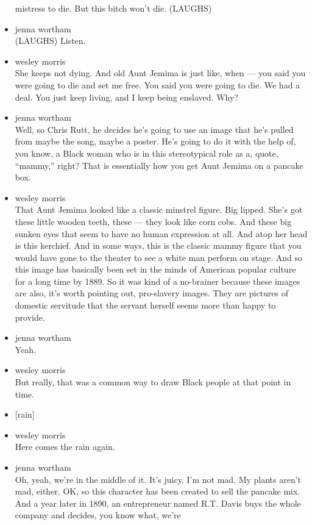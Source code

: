 \begin{itemize}
  mistress to die. But this bitch won't die. (LAUGHS)
\item
  jenna wortham\\
  (LAUGHS) Listen.
\item
  wesley morris\\
  She keeps not dying. And old Aunt Jemima is just like, when --- you
  said you were going to die and set me free. You said you were going to
  die. We had a deal. You just keep living, and I keep being enslaved.
  Why?
\item
  jenna wortham\\
  Well, so Chris Rutt, he decides he's going to use an image that he's
  pulled from maybe the song, maybe a poster. He's going to do it with
  the help of, you know, a Black woman who is in this stereotypical role
  as a, quote, ``mammy,'' right? That is essentially how you get Aunt
  Jemima on a pancake box.
\item
  wesley morris\\
  That Aunt Jemima looked like a classic minstrel figure. Big lipped.
  She's got these little wooden teeth, these --- they look like corn
  cobs. And these big sunken eyes that seem to have no human expression
  at all. And atop her head is this kerchief. And in some ways, this is
  the classic mammy figure that you would have gone to the theater to
  see a white man perform on stage. And so this image has basically been
  set in the minds of American popular culture for a long time by 1889.
  So it was kind of a no-brainer because these images are also, it's
  worth pointing out, pro-slavery images. They are pictures of domestic
  servitude that the servant herself seems more than happy to provide.
\item
  jenna wortham\\
  Yeah.
\item
  wesley morris\\
  But really, that was a common way to draw Black people at that point
  in time.
\item
  {[}rain{]}
\item
  wesley morris\\
  Here comes the rain again.
\item
  jenna wortham\\
  Oh, yeah, we're in the middle of it. It's juicy. I'm not mad. My
  plants aren't mad, either. OK, so this character has been created to
  sell the pancake mix. And a year later in 1890, an entrepreneur named
  R.T. Davis buys the whole company and decides, you know what, we're

\end{itemize}
